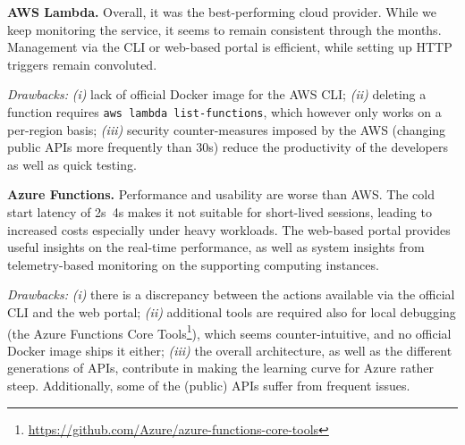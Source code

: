 \textbf{AWS Lambda.} Overall, it was the best-performing cloud provider. 
While we keep monitoring the service, it seems to remain consistent through the months.
Management via the \gls{CLI} or web-based portal is efficient, while setting up HTTP triggers remain convoluted.

\emph{Drawbacks:} 
\emph{(i)} lack of official Docker image for the \gls{AWS} \gls{CLI}; 
\emph{(ii)} deleting a function requires \texttt{aws lambda list-functions}, which however only works on a per-region basis;
\emph{(iii)} security counter-measures imposed by the AWS (\ie changing public APIs more frequently than 30s) reduce the productivity of the developers as well as quick testing.

\textbf{Azure Functions.} Performance and usability are worse than AWS. 
The cold start latency of 2s~4s makes it not suitable for short-lived sessions, leading to increased costs  especially under heavy workloads.
The web-based portal provides useful insights on the real-time performance, as well as system insights from telemetry-based monitoring on the supporting computing instances.

\emph{Drawbacks:} 
\emph{(i)} there is a discrepancy between the actions available via the official CLI and the web portal;
\emph{(ii)} additional tools are required also for local debugging (\eg the Azure Functions Core Tools\footnote{\url{https://github.com/Azure/azure-functions-core-tools}}), which seems counter-intuitive, and no official Docker image ships it either;
\emph{(iii)} the overall architecture, as well as the different generations of APIs, contribute in making the learning curve for Azure rather steep. Additionally, some of the (public) APIs suffer from frequent issues.



